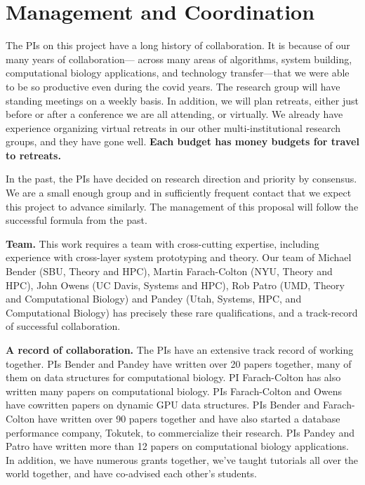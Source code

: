 

\thispagestyle{empty}


\section*{Management and Coordination}


The PIs on this project have a long history of collaboration. It is because of our many years of collaboration— across many areas of algorithms, system building, computational biology applications, and technology transfer—that we were able to be so productive even during the covid years.
%
The research group will have standing meetings on a weekly basis.  In addition, we will plan retreats, either just before or after a conference we are all attending, or virtually.  We already have experience organizing virtual retreats in our other multi-institutional research groups, and they have gone well. {\bf Each budget has money budgets for travel to retreats.}

In the past, the PIs have decided on research direction and priority by consensus. We are a small enough group and in sufficiently frequent contact that we expect this project to advance similarly. The management of this proposal will follow the successful formula from the past.

\noindent
{\bf Team.}
This work requires a team with cross-cutting expertise, including experience with cross-layer system prototyping and theory. Our team of Michael Bender (SBU, Theory and HPC), Martin Farach-Colton (NYU, Theory and HPC), John Owens (UC Davis, Systems and HPC), Rob Patro (UMD, Theory and Computational Biology) and Pandey (Utah, Systems, HPC, and Computational Biology) has precisely these rare qualifications, and a track-record of successful collaboration.
%

\noindent
{\bf A record of collaboration.}
The PIs have an extensive track record of working together. PIs Bender and Pandey have written over 20 papers together, many of them on data structures for computational biology.  PI Farach-Colton has also written many papers on computational biology.  PIs Farach-Colton and Owens have cowritten papers on dynamic GPU data structures.  PIs Bender and Farach-Colton have written over 90 papers together and have also started a database performance company, Tokutek, to commercialize their research.  PIs Pandey and Patro have written more than 12 papers on computational biology applications. In addition, we have numerous grants together, we've taught tutorials all over the world together, and have co-advised each other's students. 

